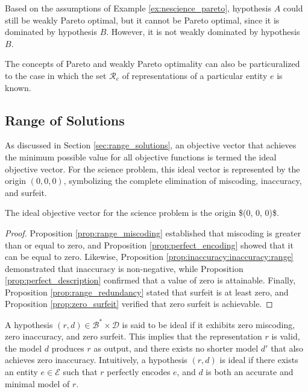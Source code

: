 \begin{example}
Based on the assumptions of Example \ref{ex:nescience_pareto}, hypothesis $A$ could still be weakly Pareto optimal, but it cannot be Pareto optimal, since it is dominated by hypothesis $B$. However, it is not weakly dominated by hypothesis $B$.
\end{example}

The concepts of Pareto and weakly Pareto optimality can also be particuralized to the case in which the set $\mathcal{R}_e$ of representations of a particular entity $e$ is known.


\subsection*{Range of Solutions}

As discussed in Section \ref{sec:range_solutions}, an objective vector that achieves the minimum possible value for all objective functions is termed the ideal objective vector. For the science problem, this ideal vector is represented by the origin $(0, 0, 0)$, symbolizing the complete elimination of miscoding, inaccuracy, and surfeit.

\begin{proposition}
The ideal objective vector for the science problem is the origin \$(0, 0, 0)\$.
\end{proposition}
\begin{proof}
Proposition \ref{prop:range_miscoding} established that miscoding is greater than or equal to zero, and Proposition \ref{prop:perfect_encoding} showed that it can be equal to zero. Likewise, Proposition \ref{prop:inaccuracy:inaccuracy:range} demonstrated that inaccuracy is non-negative, while Proposition \ref{prop:perfect_description} confirmed that a value of zero is attainable. Finally, Proposition \ref{prop:range_redundancy} stated that surfeit is at least zero, and Proposition \ref{prop:zero_surfeit} verified that zero surfeit is achievable.
\end{proof}

A hypothesis $(r, d) \in \mathcal{B}^\ast \times \mathcal{D}$ is said to be ideal if it exhibits zero miscoding, zero inaccuracy, and zero surfeit. This implies that the representation $r$ is valid, the model $d$ produces $r$ as output, and there exists no shorter model $d'$ that also achieves zero inaccuracy. Intuitively, a hypothesis $(r, d)$ is ideal if there exists an entity $e \in \mathcal{E}$ such that $r$ perfectly encodes $e$, and $d$ is both an accurate and minimal model of $r$.

